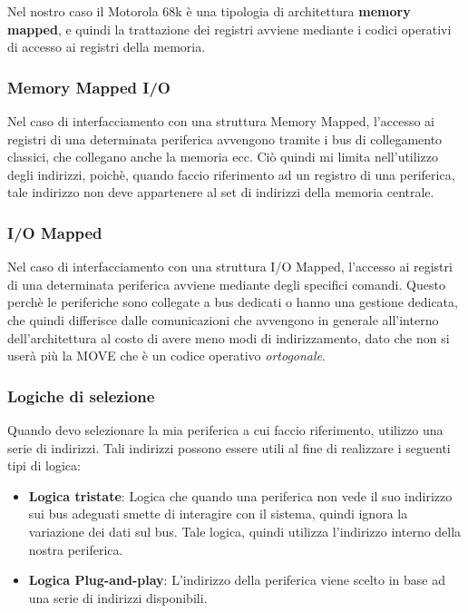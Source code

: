 Nel nostro caso il Motorola 68k è una tipologia di architettura \textbf{memory mapped}, e quindi la trattazione dei registri avviene mediante i codici operativi di accesso ai registri della memoria. 

\subsubsection{Memory Mapped I/O}
Nel caso di interfacciamento con una struttura Memory Mapped, l'accesso ai registri di una determinata periferica avvengono tramite i bus di collegamento classici, che collegano anche la memoria ecc. Ciò quindi mi limita nell'utilizzo degli indirizzi, poichè, quando faccio riferimento ad un registro di una periferica, tale indirizzo non deve appartenere al set di indirizzi della memoria centrale.

\subsubsection{I/O Mapped}
Nel caso di interfacciamento con una struttura I/O Mapped, l'accesso ai registri di una determinata periferica avviene mediante degli specifici comandi. Questo perchè le periferiche sono collegate a bus dedicati o hanno una gestione dedicata, che quindi differisce dalle comunicazioni che avvengono in generale all'interno dell'architettura al costo di avere meno modi di indirizzamento, dato che non si userà più la MOVE che è un codice operativo \textit{ortogonale}.

\subsubsection{Logiche di selezione}
Quando devo selezionare la mia periferica a cui faccio riferimento, utilizzo una serie di indirizzi. Tali indirizzi possono essere utili al fine di realizzare i seguenti tipi di logica:
\begin{itemize}
    \item \textbf{Logica tristate}: Logica che quando una periferica non vede il suo indirizzo sui bus adeguati smette di interagire con il sistema, quindi ignora la variazione dei dati sul bus. Tale logica, quindi utilizza l'indirizzo interno della nostra periferica.
    \item \textbf{Logica Plug-and-play}: L'indirizzo della periferica viene scelto in base ad una serie di indirizzi disponibili.
\end{itemize}


